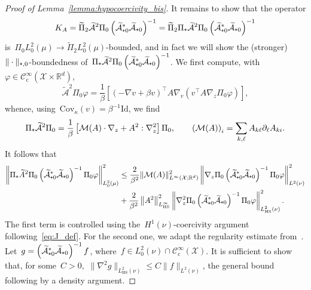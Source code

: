 \documentclass[10pt]{article}
\newcommand{\R}{\mathbb{R}}
\newcommand{\cX}{\mathcal{X}}
\newcommand{\cA}{\mathcal{A}}
\newcommand{\wLmuz}{L^2_0(\mu)}
\newcommand{\subplus}{\textnormal{\texttt{+}}}
\newcommand{\1}{\mathbbm 1}
\newcommand{\testfuncs}{\mathcal C^\infty_{\mathrm c}}
\newcommand{\Id}{\mathrm{Id}}
\begin{document}
\begin{proof}[Proof of Lemma~\ref{lemma:hypocoercivity_bis}]
    It remains to show that the operator
    $$
    K_A=\widetilde{\Pi}_2{\widetilde{\cA}^2}\Pi_0\left(\widetilde{\cA}_{\subplus 0}^*\widetilde{\cA}_{\subplus 0}\right)^{-1}=\widetilde{\Pi}_2\Pi_{\subplus}{\widetilde{\cA}^2}\Pi_0\left(\widetilde{\cA}_{\subplus 0}^*\widetilde{\cA}_{\subplus 0}\right)^{-1}
    $$
    is~$\Pi_0\wLmuz\to \widetilde{\Pi}_2\wLmuz$-bounded, and in fact we will show the (stronger)~$\|\cdot\|_{\subplus,0}$-boundedness of~$\Pi_{\subplus}{\widetilde{\cA}^2}\Pi_0\left(\widetilde{\cA}_{\subplus 0}^*\widetilde{\cA}_{\subplus 0}\right)^{-1}$.
    We first compute, with~$\varphi\in\testfuncs(\cX\times\R^d)$,
    \begin{equation}
        \widetilde{\cA}^2\Pi_0\varphi = \frac1\beta\left[\left(-\nabla v+\beta v\right)^\top A \nabla_v\left(v^\top A\nabla_z\Pi_0\varphi\right)\right],
    \end{equation}
    whence, using~$\mathrm{Cov}_{\kappa}\left(v\right)=\beta^{-1}\Id$, we find
    \begin{equation}
        \Pi_{\subplus}\widetilde{\cA}^2\Pi_0 = \frac1\beta\left[\mathcal M(A)\cdot\nabla_z + A^2 : \nabla_z^2\right]\Pi_0,\qquad \left(\mathcal M(A)\right)_{i} = \sum_{k,\ell}A_{k\ell}\partial_{\ell}A_{ki}.
    \end{equation}
    It follows that
    \begin{equation}
        \begin{aligned}
    \left\|\Pi_{\subplus}\widetilde{A}^2\Pi_0\left(\widetilde{\cA}_{\subplus 0}^*\widetilde{\cA}_{\subplus 0}\right)^{-1}\Pi_0\varphi\right\|^2_{\wLmuz}&\leq \frac{2}{\beta^2}\|\mathcal{M}(A)\|^2_{L^\infty(\cX;\R^d)}\left\|\nabla_z\Pi_0\left(\widetilde{\cA}_{\subplus 0}^*\widetilde{\cA}_{\subplus 0}\right)^{-1}\Pi_0\varphi\right\|^2_{L^2(\nu)}\\
    &+\frac{2}{\beta^2}\left\|A^2\right\|^2_{L^\infty_{\mathrm{HS}}}\left\|\nabla_z^2\Pi_0\left(\widetilde{\cA}_{\subplus 0}^*\widetilde{\cA}_{\subplus 0}\right)^{-1}\Pi_0\varphi\right\|^2_{L_{\mathrm{HS}}^2(\nu)}.
        \end{aligned}
    \end{equation}
    The first term is controlled using the~$H^1(\nu)$-coercivity argument following~\eqref{eq:J_def}. For the second one, we adapt the regularity estimate from~\cite[Lemma 3.6]{BFLS22}.
    Let~$g = \left(\widetilde{\cA}_{\subplus 0}^*\widetilde{\cA}_{\subplus 0}\right)^{-1}f$, where~$f\in L_0^2(\nu)\cap\testfuncs(\cX)$. It is sufficient to show that, for some~$C>0$,~$\|\nabla^2g\|_{L^2_{\mathrm{HS}}(\nu)}\leq C\|f\|_{L^2(\nu)}$, the general bound following by a density argument.
\end{proof}
\end{document}
